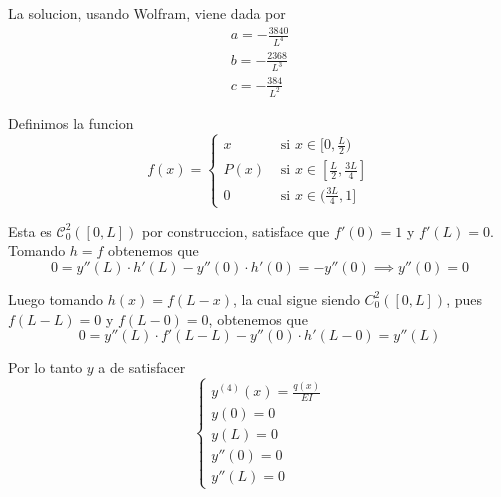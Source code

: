 \documentclass[a4paper,oneside,10.5pt]{USMArt}
\begin{document}
\begin{sol}
  La solucion, usando Wolfram, viene dada por
  \begin{gather*}
    a = -\frac{3840}{L^{4}}\\
    b = -\frac{2368}{L^{3}}\\
    c = -\frac{384}{L^{2}}
  \end{gather*}

  Definimos la funcion
  \begin{equation*}
    f(x) = \begin{cases}
      x & \text{ si } x \in [0, \frac{L}{2})\\
      P(x) & \text{ si } x \in [\frac{L}{2}, \frac{3L}{4}]\\
      0 & \text{ si } x \in (\frac{3L}{4}, 1]
    \end{cases}
  \end{equation*}

  Esta es $\mathcal{C}^{2}_{0}([0, L])$ por construccion, satisface que $f'(0) = 1$ y $f'(L) = 0$. Tomando $h = f$
  obtenemos que
  \begin{equation*}
    0 = y''(L) \cdot h'(L) - y''(0) \cdot h'(0) = -y''(0) \implies y''(0) = 0
  \end{equation*}

  Luego tomando $h(x) = f(L - x)$, la cual sigue siendo $C^{2}_{0}([0, L])$, pues $f(L - L) = 0$ y $f(L - 0) = 0$,
  obtenemos que
  \begin{equation*}
    0 = y''(L) \cdot f'(L - L) - y''(0) \cdot h'(L - 0) = y''(L)
  \end{equation*}

  Por lo tanto $y$ a de satisfacer
  \begin{equation*}
    \begin{cases}
      y^{(4)}(x) = \frac{q(x)}{EI}\\
      y(0) = 0\\
      y(L) = 0\\
      y''(0) = 0\\
      y''(L) = 0
    \end{cases}
  \end{equation*}
\end{sol}
\end{document}
